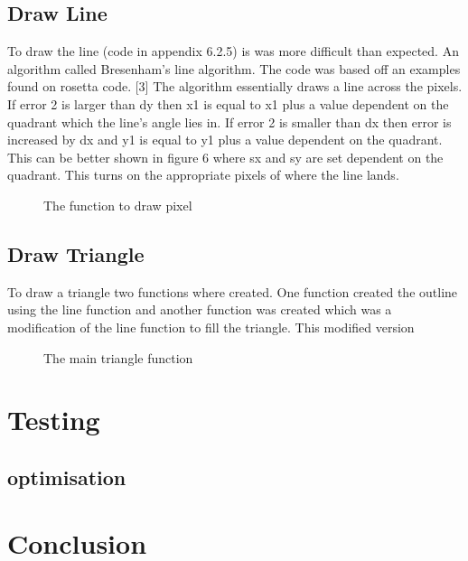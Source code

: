 \documentclass[a4paper,12pt]{article}
\newcommand{\GraphicsC}{../Graphics/Graphics.c}
\begin{document}
\subsection{Draw Line}
\begin{flushleft}
To draw the line (code in appendix 6.2.5) is was more difficult than expected. An algorithm called Bresenham's line algorithm. The code was based off an examples found on rosetta code. [3]  The algorithm essentially draws a line across the pixels. If error 2 is larger than dy then x1 is equal to x1 plus a value dependent on the quadrant which the line's angle lies in. If error 2 is smaller than dx then error is increased by dx and y1 is equal to y1 plus a value dependent on the quadrant. This can be better shown in figure 6 where sx and sy are set dependent on the quadrant. This turns on the appropriate pixels of where the line lands.
\end{flushleft}
\begin{figure}[h]
	\centering
	\setlength{\belowcaptionskip}{-15pt}
	
	\caption{The function to draw pixel}
\end{figure}
\subsection{Draw Triangle}
\begin{flushleft}
To draw a triangle two functions where created. One function created the outline using the line function and another function was created which was a modification of the line function to fill the triangle. \newline \newline
This modified version 
\end{flushleft}
\begin{figure}[h]
	\centering
	\setlength{\belowcaptionskip}{-15pt}
	
	\caption{The main triangle function}
\end{figure}

\section{Testing}
\subsection{optimisation}
\section{Conclusion}
\end{document}
